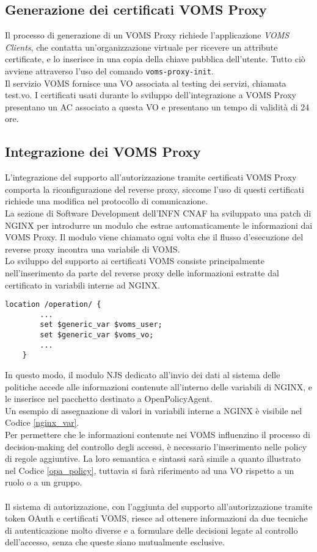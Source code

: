 \subsection{Generazione dei certificati VOMS Proxy}
Il processo di generazione di un VOMS Proxy richiede l'applicazione \textit{VOMS Clients}, che contatta un'organizzazione virtuale per ricevere un attribute 
certificate, e lo inserisce in una copia della chiave pubblica dell'utente. Tutto ciò avviene attraverso l'uso del comando \texttt{voms-proxy-init}. 
\\Il servizio VOMS fornisce una VO associata al testing dei servizi, chiamata test.vo. I certificati usati durante lo sviluppo 
dell'integrazione a VOMS Proxy presentano un AC associato a questa VO e presentano un tempo di validità di 24 ore.   

\subsection{Integrazione dei VOMS Proxy}
L'integrazione del supporto all'autorizzazione tramite certificati VOMS Proxy comporta la riconfigurazione del reverse proxy, 
siccome l'uso di questi certificati richiede una modifica nel protocollo di comunicazione. 
\\ La sezione di Software Development dell'INFN CNAF ha sviluppato una patch di NGINX per introdurre un modulo che estrae automaticamente le informazioni dai VOMS Proxy.
 Il modulo viene chiamato ogni volta che il flusso d'esecuzione del reverse proxy incontra una variabile di VOMS.
\\ Lo sviluppo del supporto ai certificati VOMS consiste principalmente nell'inserimento da parte del reverse proxy 
delle informazioni estratte dal certificato in variabili interne ad NGINX. 

\begin{lstlisting}[caption={Assegnazione di variabili in NGINX},captionpos=b,label=nginx_var]
    location /operation/ {
        ...
        set $generic_var $voms_user;
        set $generic_var $voms_vo;
        ...
    }
\end{lstlisting}
In questo modo, il modulo NJS dedicato all'invio dei dati al sistema delle politiche accede alle informazioni contenute all'interno delle variabili di NGINX, 
e le inserisce nel pacchetto destinato a OpenPolicyAgent. 
\\Un esempio di assegnazione di valori in variabili interne a 
NGINX è visibile nel Codice \ref{nginx_var}.
\\ Per permettere che le informazioni contenute nei VOMS influenzino il processo di decision-making del controllo degli accessi,
 è necessario l'inserimento nelle policy di regole aggiuntive. La loro semantica e sintassi sarà simile a quanto illustrato nel Codice \ref*{opa_policy},
tuttavia si farà riferimento ad una VO rispetto a un ruolo o a un gruppo.
\\ \\ Il sistema di autorizzazione, con l'aggiunta del supporto all'autorizzazione tramite token OAuth e certificati VOMS, riesce ad ottenere informazioni 
da due tecniche di autenticazione molto diverse e a formulare delle decisioni legate al controllo dell'accesso, senza che queste siano mutualmente esclusive. 

